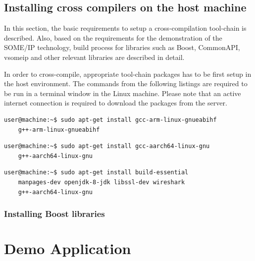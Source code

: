 \subsection{Installing cross compilers on the host machine}
In this section, the basic requirements to setup a cross-compilation tool-chain is described. Also, based on the requirements for the demonstration of the SOME/IP technology, build process for libraries such as Boost, CommonAPI, vsomeip and other relevant libraries are described in detail. 
\par In order to cross-compile, appropriate tool-chain packages has to be first setup in the host environment. The commands from the following listings are required to be run in a terminal window in the Linux machine. Please note that an active internet connection is required to download the packages from the server. 

\begin{lstlisting}[language=bash, caption={Command to install packages for ARM 32-bit (armv7) tool-chain}]
  user@machine:~$ sudo apt-get install gcc-arm-linux-gnueabihf
	g++-arm-linux-gnueabihf
\end{lstlisting}

\begin{lstlisting}[language=bash, caption={Command to install packages for ARM 64-bit(armv8) tool-chain}]
  user@machine:~$ sudo apt-get install gcc-aarch64-linux-gnu
	g++-aarch64-linux-gnu
\end{lstlisting}

\begin{lstlisting}[language=bash, caption={Command to install other required packages}]
  user@machine:~$ sudo apt-get install build-essential
	manpages-dev openjdk-8-jdk libssl-dev wireshark 
	g++-aarch64-linux-gnu
\end{lstlisting} 

\subsubsection{Installing Boost libraries}


\section{Demo Application}
